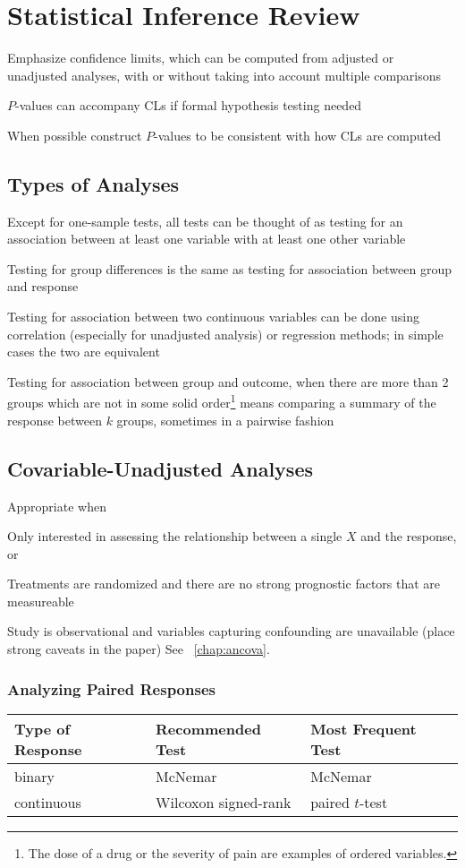 \chapter{Statistical Inference Review}
\bi
\item Emphasize confidence limits, which can be computed from adjusted
  or unadjusted analyses, with or without taking into account multiple
  comparisons
\item $P$-values can accompany CLs if formal hypothesis testing needed
\item When possible construct $P$-values to be consistent with how CLs
  are computed
\ei

\section{Types of Analyses}
\bi
\item Except for one-sample tests, all tests can be thought of as
  testing for an association between at least one variable with at
  least one other variable
\item Testing for group differences is the same as testing for
  association between group and response
\item Testing for association between two continuous variables can be
  done using correlation (especially for unadjusted analysis) or
  regression methods; in simple cases the two are equivalent
\item Testing for association between group and outcome, when there
  are more than 2 groups which are not in some solid
  order\footnote{The dose of a drug or the severity of pain are
    examples of ordered variables.} means comparing a summary of the
  response between $k$ groups, sometimes in a pairwise fashion
\ei

\section{Covariable-Unadjusted Analyses}
Appropriate when
\bi
\item Only interested in assessing the relationship between a single
   $X$ and the response, or
\item Treatments are randomized and there are no strong prognostic
   factors that are measureable
\item Study is observational and variables capturing confounding are
   unavailable (place strong caveats in the paper)
\ei
See ~\ref{chap:ancova}.   %

\subsection{Analyzing Paired Responses}
\begin{center}\begin{tabular}{lll} \hline
Type of Response & Recommended Test & Most Frequent Test \\ \hline
binary     & McNemar & McNemar \\
continuous & Wilcoxon signed-rank & paired $t$-test \\ \hline
\end{tabular}\end{center}

